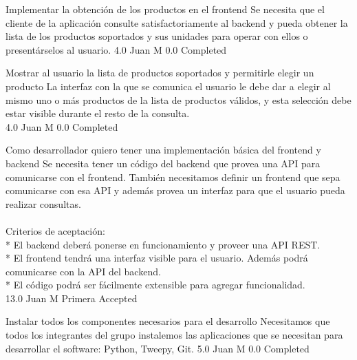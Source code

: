 		{Implementar la obtención de los productos en el frontend} %
		{Se necesita que el cliente de la aplicación consulte satisfactoriamente al
backend y pueda obtener la lista de los productos soportados y sus unidades
para operar con ellos o presentárselos al usuario.
} %
		{4.0} %
		{Juan M} %
		{0.0} %
		{Completed} %

		{Mostrar al usuario la lista de productos soportados y permitirle elegir un producto} %
		{La interfaz con la que se comunica el usuario le debe dar a elegir al mismo
uno o más productos de la lista de productos válidos, y esta selección debe
estar visible durante el resto de la consulta.\\
} %
		{4.0} %
		{Juan M} %
		{0.0} %
		{Completed} %


\vspace{20pt}

	{Como desarrollador quiero tener una implementación básica del frontend y backend} %
	{Se necesita tener un código del backend que provea una API para comunicarse
con el frontend. También necesitamos definir un frontend que sepa comunicarse
con esa API y además provea un interfaz para que el usuario pueda realizar
consultas.\\
  \\
Criterios de aceptación:\\
* El backend deberá ponerse en funcionamiento y proveer una API REST.  \\
* El frontend tendrá una interfaz visible para el usuario. Además podrá comunicarse con la API del backend.  \\
* El código podrá ser fácilmente extensible para agregar funcionalidad.\\
} %
	{} %
	{13.0} %
	{Juan M} %
	{Primera} %
	{Accepted} %

		{Instalar todos los componentes necesarios para el desarrollo} %
		{Necesitamos que todos los integrantes del grupo instalemos las aplicaciones
que se necesitan para desarrollar el software: Python, Tweepy, Git.
} %
		{5.0} %
		{Juan M} %
		{0.0} %
		{Completed} %

